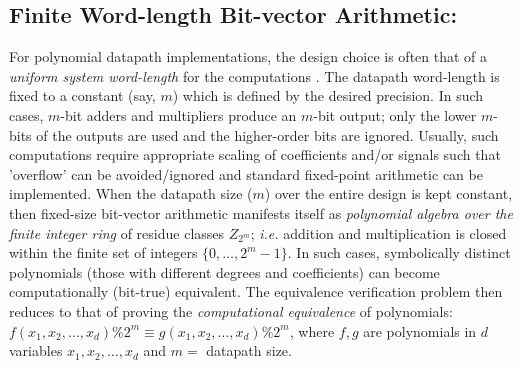 \subsection{Finite Word-length Bit-vector Arithmetic:} 
For polynomial datapath implementations, the design choice is often
that of a {\it uniform system word-length} for the computations
\cite{word-len-opt-hlsynth}. The datapath word-length is fixed to a
constant (say, $m$) which is defined by the desired precision. In such
cases, $m$-bit adders and multipliers produce an $m$-bit output; only
the lower $m$-bits of the outputs are used and the higher-order bits
are ignored. Usually, such computations require appropriate scaling of
coefficients and/or signals such that 'overflow' can be
avoided/ignored and standard fixed-point arithmetic can be
implemented. When the datapath size ($m$) over the entire design is
kept constant, then fixed-size bit-vector arithmetic manifests itself
as {\it polynomial algebra over the finite integer ring} of residue
classes $Z_{2^m}$; {\it i.e.}  addition and multiplication is closed
within the finite set of integers $\{0, \ldots, 2^{m} -1 \}$. In such
cases, symbolically distinct polynomials (those with different degrees
and coefficients) can become computationally (bit-true)
equivalent. The equivalence verification problem then reduces to that
of proving the {\it computational equivalence} of polynomials: $f(x_1,
x_2, \ldots, x_d) \% 2^m \equiv g(x_1, x_2, \ldots, x_d) \%2^m$, where
$f, g$ are polynomials in $d$ variables $x_1, x_2, \ldots, x_d$ and $m
=$ datapath size.

